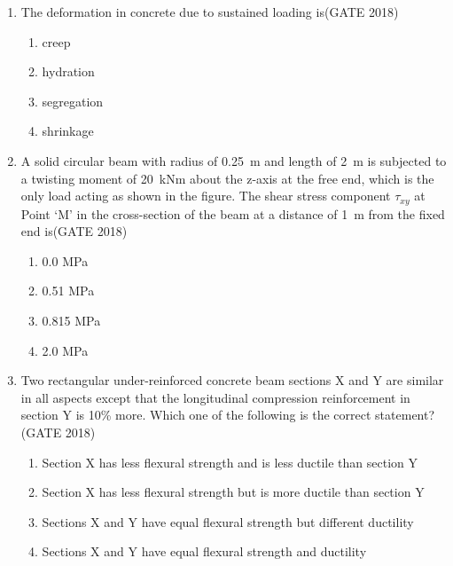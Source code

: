 \documentclass[journal,12pt,onecolumn]{IEEEtran}
\theoremstyle{remark}
\begin{document}
\begin{enumerate}
\item The deformation in concrete due to sustained loading is\hfill{(GATE 2018)}
\begin{multicols}{4}
\begin{enumerate}
    \item creep
    \item hydration
    \item segregation
    \item shrinkage
\end{enumerate}
\end{multicols}
\vspace{1cm}

\item A solid circular beam with radius of 0.25~m and length of 2~m is subjected to a twisting moment of 20~kNm about the z-axis at the free end, which is the only load acting as shown in the figure. The shear stress component $\tau_{xy}$ at Point `M' in the cross-section of the beam at a distance of 1~m from the fixed end is\hfill{(GATE 2018)}
\begin{multicols}{4}
\begin{enumerate}
    \item 0.0 MPa
    \item 0.51 MPa
    \item 0.815 MPa
    \item 2.0 MPa
\end{enumerate}
\end{multicols}
\vspace{1cm}

\item Two rectangular under-reinforced concrete beam sections X and Y are similar in all aspects except that the longitudinal compression reinforcement in section Y is 10\% more. Which one of the following is the correct statement?\hfill{(GATE 2018)}
\begin{multicols}{4}
\begin{enumerate}
    \item Section X has less flexural strength and is less ductile than section Y
    \item Section X has less flexural strength but is more ductile than section Y
    \item Sections X and Y have equal flexural strength but different ductility
    \item Sections X and Y have equal flexural strength and ductility
\end{enumerate}
\end{multicols}
\vspace{1cm}


\end{enumerate}
\end{document}
